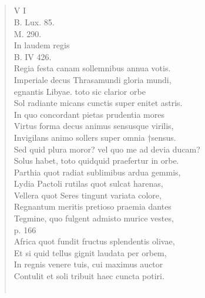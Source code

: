 \documentclass[11pt, a4paper]{report}
\begin{document}
            \subsection*{}
      \begin{verse}
      V I \\ B. Lux. 85. \\ M. 290. \\ In laudem regis \\ B. IV 426. \\ Regia festa canam sollemnibus annua votis. \\ Imperiale decus Thrasamundi gloria mundi, \\ egnantis Libyae. toto sic clarior orbe \\ Sol radiante micans cunctis super enitet astris. \\ In quo concordant pietas prudentia mores \\ Virtus forma decus animus sensusque virilis, \\ Invigilans animo sollers super omnia †sensus. \\ Sed quid plura moror? vel quo me ad devia ducam? \\ Solus habet, toto quidquid praefertur in orbe. \\ Parthia quot radiat sublimibus ardua gemmis, \\ Lydia Pactoli rutilas quot sulcat harenas, \\ Vellera quot Seres tingunt variata colore, \\ Regnantum meritis pretioso praemia dantes \\ Tegmine, quo fulgent admisto murice vestes, \\ p. 166 \\ Africa quot fundit fructus splendentis olivae, \\ Et si quid tellus gignit laudata per orbem, \\ In regnis venere tuis, cui maximus auctor \\ Contulit et soli tribuit haec cuncta potiri. \\ 
        ﻿\pagebreak 

\end{verse}
\end{document}
